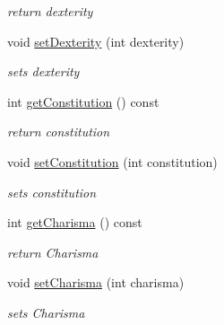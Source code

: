 \begin{DoxyCompactItemize}
\begin{DoxyCompactList}\small\item\em return dexterity \end{DoxyCompactList}\item 
\hypertarget{class_character_attr_a6db98108e1ce8bab365a270193dcb4ce}{}\label{class_character_attr_a6db98108e1ce8bab365a270193dcb4ce} 
void \hyperlink{class_character_attr_a6db98108e1ce8bab365a270193dcb4ce}{set\+Dexterity} (int dexterity)
\begin{DoxyCompactList}\small\item\em sets dexterity \end{DoxyCompactList}\item 
\hypertarget{class_character_attr_a7dda19ae93ca74c73589d0032c2a3241}{}\label{class_character_attr_a7dda19ae93ca74c73589d0032c2a3241} 
int \hyperlink{class_character_attr_a7dda19ae93ca74c73589d0032c2a3241}{get\+Constitution} () const
\begin{DoxyCompactList}\small\item\em return constitution \end{DoxyCompactList}\item 
\hypertarget{class_character_attr_abcdef3f4435feda32fe8d3f8b50356ff}{}\label{class_character_attr_abcdef3f4435feda32fe8d3f8b50356ff} 
void \hyperlink{class_character_attr_abcdef3f4435feda32fe8d3f8b50356ff}{set\+Constitution} (int constitution)
\begin{DoxyCompactList}\small\item\em sets constitution \end{DoxyCompactList}\item 
\hypertarget{class_character_attr_a3aa0eb0d0a5389cdd4390d06cd128431}{}\label{class_character_attr_a3aa0eb0d0a5389cdd4390d06cd128431} 
int \hyperlink{class_character_attr_a3aa0eb0d0a5389cdd4390d06cd128431}{get\+Charisma} () const
\begin{DoxyCompactList}\small\item\em return Charisma \end{DoxyCompactList}\item 
\hypertarget{class_character_attr_a5507cd0d2f89f42f9834c16c12d23ca8}{}\label{class_character_attr_a5507cd0d2f89f42f9834c16c12d23ca8} 
void \hyperlink{class_character_attr_a5507cd0d2f89f42f9834c16c12d23ca8}{set\+Charisma} (int charisma)
\begin{DoxyCompactList}\small\item\em sets Charisma \end{DoxyCompactList}\end{DoxyCompactItemize}
